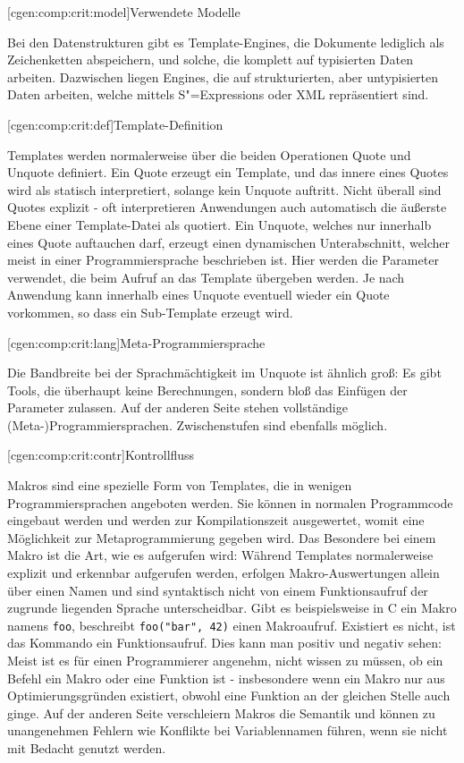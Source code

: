 \documentclass[a4paper, bibgerm]{book}
\newcommand\icode[1]{\lstinline?#1?}
\newcommand\lsubsubsection{}
\newcommand{\sexps}{S"=Expressions}
\begin{document}
\lsubsubsection[cgen:comp:crit:model]{Verwendete Modelle}

Bei den Datenstrukturen gibt es
Template-Engines, die Dokumente lediglich als Zeichenketten
abspeichern, und solche, die komplett auf typisierten Daten
arbeiten. Dazwischen liegen Engines, die auf strukturierten, aber
untypisierten Daten arbeiten, welche mittels \sexps{} oder XML
repräsentiert sind.

\lsubsubsection[cgen:comp:crit:def]{Template-Definition}

Templates werden normalerweise über die beiden Operationen Quote und
Unquote definiert. Ein Quote erzeugt ein Template, und das innere eines
Quotes wird als statisch interpretiert, solange kein Unquote
auftritt. Nicht überall sind Quotes explizit - oft interpretieren
Anwendungen auch automatisch die äußerste Ebene einer Template-Datei als
quotiert. Ein Unquote, welches nur innerhalb eines Quote auftauchen
darf, erzeugt einen dynamischen Unterabschnitt, welcher meist in einer
Programmiersprache beschrieben ist. Hier werden die Parameter verwendet,
die beim Aufruf an das Template übergeben werden. Je nach Anwendung kann
innerhalb eines Unquote eventuell wieder ein Quote vorkommen, so dass
ein Sub-Template erzeugt wird.

\lsubsubsection[cgen:comp:crit:lang]{Meta-Programmiersprache}

Die Bandbreite bei der Sprachmächtigkeit im Unquote
ist ähnlich groß: Es gibt Tools, die überhaupt keine Berechnungen,
sondern bloß das Einfügen der Parameter zulassen. Auf der anderen Seite
stehen vollständige (Meta-)Programmiersprachen. Zwischenstufen sind
ebenfalls möglich.

\lsubsubsection[cgen:comp:crit:contr]{Kontrollfluss}

Makros sind eine spezielle Form von Templates, die in wenigen
Programmiersprachen angeboten werden. Sie können in normalen
Programmcode eingebaut werden und werden zur Kompilationszeit
ausgewertet, womit eine Möglichkeit zur Metaprogrammierung gegeben
wird. Das Besondere bei einem Makro ist die Art, wie es aufgerufen wird:
Während Templates normalerweise explizit und erkennbar aufgerufen
werden, erfolgen Makro-Auswertungen allein über einen Namen und sind
syntaktisch nicht von einem Funktionsaufruf der zugrunde liegenden
Sprache unterscheidbar. Gibt es beispielsweise in C ein Makro namens
\icode{foo}, beschreibt \icode{foo("bar", 42)} einen
Makroaufruf. Existiert es nicht, ist das Kommando ein Funktionsaufruf.
Dies kann man positiv und negativ sehen: Meist ist es für einen
Programmierer angenehm, nicht wissen zu müssen, ob ein Befehl ein Makro
oder eine Funktion ist - insbesondere wenn ein Makro nur aus
Optimierungsgründen existiert, obwohl eine Funktion an der gleichen
Stelle auch ginge. Auf der anderen Seite verschleiern Makros die
Semantik und können zu unangenehmen Fehlern wie Konflikte bei
Variablennamen führen, wenn sie nicht mit Bedacht genutzt werden.
\end{document}
